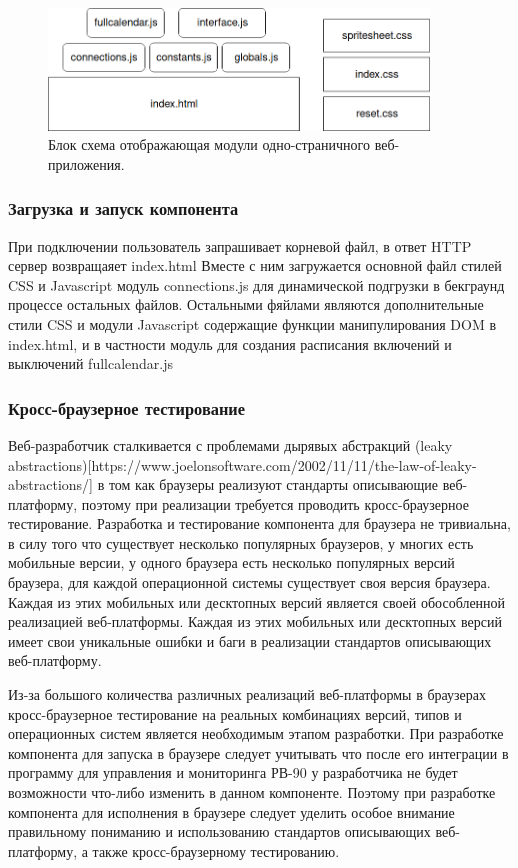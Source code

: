 \begin{figure}[h!]
    \centering
    \includegraphics[width=0.9\textwidth]{webapp_modules_blocks.png}
    \caption{Блок схема отображающая модули одно-страничного веб-приложения.}
\end{figure}

\subsubsection{ Загрузка и запуск компонента}
При подключении пользователь запрашивает корневой файл, в ответ HTTP сервер возвращаяет index.html
Вместе с ним загружается основной файл стилей CSS и Javascript модуль connections.js для динамической подгрузки в бекграунд процессе остальных файлов. Остальными фяйлами являются дополнительные стили CSS и модули Javascript содержащие функции манипулирования DOM в index.html, и в частности модуль для создания расписания включений и выключений fullcalendar.js  

\subsubsection{ Кросс-браузерное тестирование}
Веб-разработчик сталкивается с проблемами дырявых абстракций (leaky abstractions)[https://www.joelonsoftware.com/2002/11/11/the-law-of-leaky-abstractions/] в том как браузеры реализуют стандарты описывающие веб-платформу, поэтому при реализации требуется проводить кросс-браузерное тестирование.
Разработка и тестирование компонента для браузера не тривиальна, в силу того что 
существует несколько популярных браузеров, у многих есть мобильные версии, у одного браузера есть несколько популярных версий браузера, для каждой операционной системы существует своя версия браузера. Каждая из этих мобильных или десктопных версий является своей обособленной реализацией веб-платформы. Каждая из этих мобильных или десктопных версий имеет свои уникальные ошибки и баги в реализации стандартов описывающих веб-платформу. 

Из-за большого количества различных реализаций веб-платформы в браузерах кросс-браузерное тестирование на реальных комбинациях версий, типов и операционных систем является необходимым этапом разработки. При разработке компонента для запуска в браузере следует учитывать что после его интеграции в программу для управления и мониторинга РВ-90 у разработчика не будет возможности что-либо изменить в данном компоненте. Поэтому при разработке компонента для исполнения в браузере следует уделить особое внимание правильному пониманию и использованию стандартов описывающих веб-платформу, а также кросс-браузерному тестированию. 

